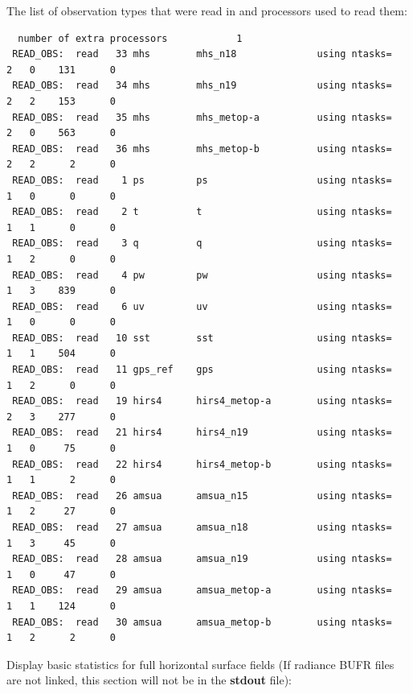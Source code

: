 The list of observation types that were read in and processors used to read them:

\begin{scriptsize}
\begin{verbatim}
  number of extra processors            1
 READ_OBS:  read   33 mhs        mhs_n18              using ntasks=   2   0    131      0
 READ_OBS:  read   34 mhs        mhs_n19              using ntasks=   2   2    153      0
 READ_OBS:  read   35 mhs        mhs_metop-a          using ntasks=   2   0    563      0
 READ_OBS:  read   36 mhs        mhs_metop-b          using ntasks=   2   2      2      0
 READ_OBS:  read    1 ps         ps                   using ntasks=   1   0      0      0
 READ_OBS:  read    2 t          t                    using ntasks=   1   1      0      0
 READ_OBS:  read    3 q          q                    using ntasks=   1   2      0      0
 READ_OBS:  read    4 pw         pw                   using ntasks=   1   3    839      0
 READ_OBS:  read    6 uv         uv                   using ntasks=   1   0      0      0
 READ_OBS:  read   10 sst        sst                  using ntasks=   1   1    504      0
 READ_OBS:  read   11 gps_ref    gps                  using ntasks=   1   2      0      0
 READ_OBS:  read   19 hirs4      hirs4_metop-a        using ntasks=   2   3    277      0
 READ_OBS:  read   21 hirs4      hirs4_n19            using ntasks=   1   0     75      0
 READ_OBS:  read   22 hirs4      hirs4_metop-b        using ntasks=   1   1      2      0
 READ_OBS:  read   26 amsua      amsua_n15            using ntasks=   1   2     27      0
 READ_OBS:  read   27 amsua      amsua_n18            using ntasks=   1   3     45      0
 READ_OBS:  read   28 amsua      amsua_n19            using ntasks=   1   0     47      0
 READ_OBS:  read   29 amsua      amsua_metop-a        using ntasks=   1   1    124      0
 READ_OBS:  read   30 amsua      amsua_metop-b        using ntasks=   1   2      2      0
\end{verbatim}
\end{scriptsize}
Display basic statistics for full horizontal surface fields (If radiance BUFR files are not linked, this section will not be in the \textbf{stdout} file):

